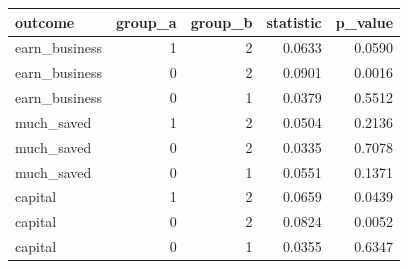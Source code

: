 
\begin{tabular}{lrrrr}
\toprule
outcome & group\_a & group\_b & statistic & p\_value\\
\midrule
earn\_business & 1 & 2 & 0.0633 & 0.0590\\
earn\_business & 0 & 2 & 0.0901 & 0.0016\\
earn\_business & 0 & 1 & 0.0379 & 0.5512\\
much\_saved & 1 & 2 & 0.0504 & 0.2136\\
much\_saved & 0 & 2 & 0.0335 & 0.7078\\
\addlinespace
much\_saved & 0 & 1 & 0.0551 & 0.1371\\
capital & 1 & 2 & 0.0659 & 0.0439\\
capital & 0 & 2 & 0.0824 & 0.0052\\
capital & 0 & 1 & 0.0355 & 0.6347\\
\bottomrule
\end{tabular}
